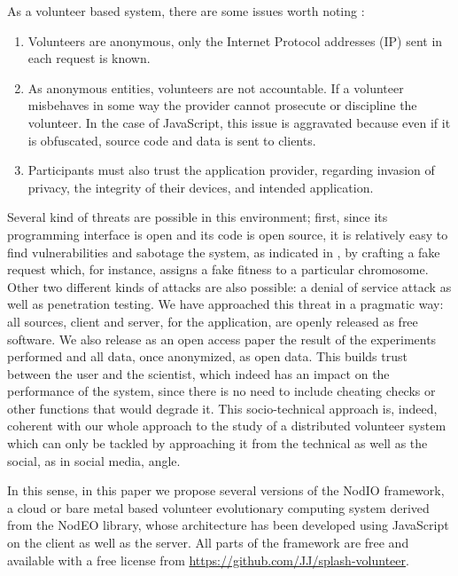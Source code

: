 \documentclass[journal,onecolumn]{IEEEtran}
\begin{document}
As a volunteer based system, there are some issues worth 
noting \cite{sarmenta2001volunteer,web:BOINC} :\begin{enumerate}
\item Volunteers are anonymous, only the Internet Protocol addresses (IP) sent in 
each request is known.
\item As anonymous entities, volunteers are not accountable. 
If a volunteer misbehaves in some way the provider cannot 
prosecute or discipline the volunteer. In the case of JavaScript,
this issue is aggravated because even if it is obfuscated, source code
and data is sent to clients. 
\item Participants must also trust the application provider, 
regarding invasion of privacy, the integrity of their devices, 
and intended application. 
\end{enumerate}

Several kind of threats are possible in this environment; first, since its
programming interface is open and its code is open source, it is
relatively easy to find vulnerabilities and 
sabotage the system, as indicated in \cite{domingues2007sabotage}, by
crafting a fake request which, for instance, assigns a fake fitness to
a particular chromosome.
Other two different kinds of attacks are also
possible: a denial of service attack as well as penetration
testing. We have approached this threat in a pragmatic way: all
sources, client and server, for the application, are openly released
as free software. 
 We also release as an open access paper the result of the 
 experiments performed \cite{DBLP:journals/corr/GuervosG15}  
 and all data, once anonymized, as open data. This
builds trust between the user and the scientist, which indeed has an
impact on the performance of the system, since there is no need to
include cheating checks or other functions that would degrade it. This
socio-technical approach is, indeed, 
coherent with our whole approach to the study of a distributed volunteer
 system which can only be tackled by approaching it from the
technical as well as the social, as in social media, angle. 

In this sense, in this paper we propose several versions of the {\sf NodIO} framework, a
cloud or bare metal based volunteer evolutionary computing system
derived from %
 the {\sf NodEO} library, whose architecture has been
developed using JavaScript on the client as well as the server.
All parts of the framework are free and available with a free license
from \url{https://github.com/JJ/splash-volunteer}.
\end{document}

